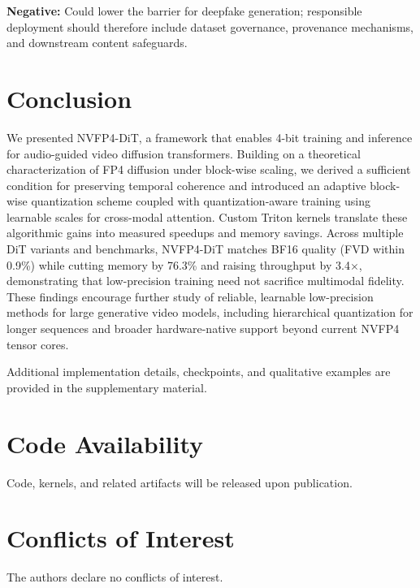 \documentclass[journal,twoside]{IEEEtran}
\theoremstyle{definition}
\theoremstyle{remark}
\begin{document}
\textbf{Negative:} Could lower the barrier for deepfake generation; responsible deployment should therefore include dataset governance, provenance mechanisms, and downstream content safeguards.

\section{Conclusion}
\label{sec:conclusion}

We presented NVFP4-DiT, a framework that enables 4-bit training and inference for audio-guided video diffusion transformers. Building on a theoretical characterization of FP4 diffusion under block-wise scaling, we derived a sufficient condition for preserving temporal coherence and introduced an adaptive block-wise quantization scheme coupled with quantization-aware training using learnable scales for cross-modal attention. Custom Triton kernels translate these algorithmic gains into measured speedups and memory savings. Across multiple DiT variants and benchmarks, NVFP4-DiT matches BF16 quality (FVD within 0.9\%) while cutting memory by 76.3\% and raising throughput by 3.4$\times$, demonstrating that low-precision training need not sacrifice multimodal fidelity. These findings encourage further study of reliable, learnable low-precision methods for large generative video models, including hierarchical quantization for longer sequences and broader hardware-native support beyond current NVFP4 tensor cores.

Additional implementation details, checkpoints, and qualitative examples are provided in the supplementary material.

\section*{Code Availability}
Code, kernels, and related artifacts will be released upon publication.

\section*{Conflicts of Interest}
The authors declare no conflicts of interest.
\end{document}

